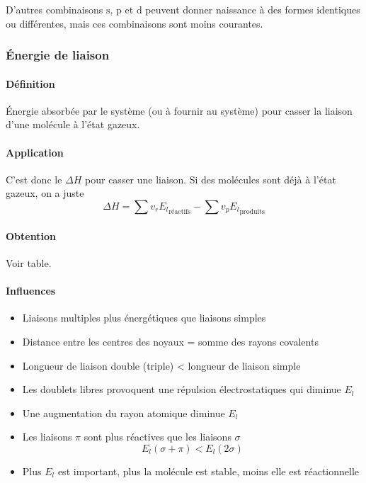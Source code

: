 \documentclass[11pt,a4paper,french]{article}
\newcommand\sorb{\mathrm{s}}
\newcommand\porb{\mathrm{p}}
\newcommand\dorb{\mathrm{d}}
\begin{document}
D'autres combinaisons $\sorb$, $\porb$ et $\dorb$ peuvent donner naissance à des formes identiques ou différentes, mais ces combinaisons sont moins courantes.

\subsubsection{\'Energie de liaison}
\label{sec:E_l}

\paragraph{Définition}
\'Energie absorbée par le système (ou à fournir au système) pour casser la liaison d'une molécule à l'état gazeux.

\paragraph{Application}
C'est donc le $\Delta H$ pour casser une liaison.
Si des molécules sont déjà à l'état gazeux, on a juste
\[ \Delta H = \sum v_r{E_l}_\mathrm{réactifs} - \sum v_p{E_l}_\mathrm{produits} \]

\paragraph{Obtention}
Voir table.

\paragraph{Influences}
\begin{itemize}
	\item Liaisons multiples plus énergétiques que liaisons simples
	\item Distance entre les centres des noyaux = somme des rayons covalents
	\item Longueur de liaison double (triple) < longueur de liaison simple
	\item Les doublets libres provoquent une répulsion électrostatiques qui diminue $E_l$
	\item Une augmentation du rayon atomique diminue $E_l$
	\item Les liaisons $\pi$ sont plus réactives que les liaisons $\sigma$
		\[ E_l(\sigma + \pi) <  E_l(2\sigma) \]
	\item Plus $E_l$ est important, plus la molécule est stable, moins elle est réactionnelle
\end{itemize}
\end{document}
